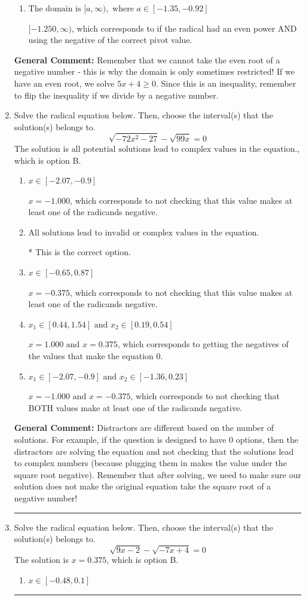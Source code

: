 \documentclass{extbook}[14pt]
\newcommand{\litem}[1]{\item #1

\rule{\textwidth}{0.4pt}}
\begin{document}
\begin{enumerate}
{\begin{enumerate}[label=\Alph*.]
$(-\infty, -0.800]$, which corresponds to if the radical had an even power AND reversing the direction of the domain.
\item \( \text{The domain is } [a, \infty), \text{   where } a \in [-1.35, -0.92] \)

$[-1.250, \infty)$, which corresponds to if the radical had an even power AND using the negative of the correct pivot value.
\end{enumerate}

\textbf{General Comment:} Remember that we cannot take the even root of a negative number - this is why the domain is only sometimes restricted! If we have an even root, we solve $5 x + 4 \geq 0$. Since this is an inequality, remember to flip the inequality if we divide by a negative number.
}
\litem{
Solve the radical equation below. Then, choose the interval(s) that the solution(s) belongs to.
\[ \sqrt{-72 x^2 - 27} - \sqrt{99 x} = 0 \]The solution is \( \text{all potential solutions lead to complex values in the equation.} \), which is option B.\begin{enumerate}[label=\Alph*.]
\item \( x \in [-2.07,-0.9] \)

$x = -1.000$, which corresponds to not checking that this value makes at least one of the radicands negative.
\item \( \text{All solutions lead to invalid or complex values in the equation.} \)

* This is the correct option.
\item \( x \in [-0.65,0.87] \)

$x = -0.375$, which corresponds to not checking that this value makes at least one of the radicands negative.
\item \( x_1 \in [0.44, 1.54] \text{ and } x_2 \in [0.19,0.54] \)

$x = 1.000 \text{ and } x = 0.375$, which corresponds to getting the negatives of the values that make the equation 0.
\item \( x_1 \in [-2.07, -0.9] \text{ and } x_2 \in [-1.36,0.23] \)

$x = -1.000 \text{ and } x = -0.375$, which corresponds to not checking that BOTH values make at least one of the radicands negative.
\end{enumerate}

\textbf{General Comment:} Distractors are different based on the number of solutions. For example, if the question is designed to have 0 options, then the distractors are solving the equation and not checking that the solutions lead to complex numbers (because plugging them in makes the value under the square root negative). Remember that after solving, we need to make sure our solution does not make the original equation take the square root of a negative number!
}
\litem{
Solve the radical equation below. Then, choose the interval(s) that the solution(s) belongs to.
\[ \sqrt{9 x - 2} - \sqrt{-7 x + 4} = 0 \]The solution is \( x = 0.375 \), which is option B.\begin{enumerate}[label=\Alph*.]
\item \( x \in [-0.48,0.1] \)


\end{enumerate}}
\end{enumerate}
\end{document}
